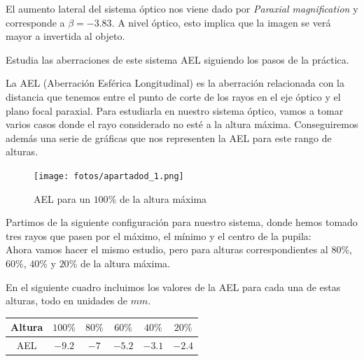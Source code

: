 \documentclass[11pt]{article}
\newcommand{\preguntaAlaMadreDeRocio}[1]{\begin{Theorem}{#1}{}\end{Theorem}}
\begin{document}
        \noindent El aumento lateral del sistema óptico nos viene dado por \textit{Paraxial magnification} y corresponde a $\beta = -3.83$. A nivel óptico, esto implica que la imagen se verá mayor a invertida al objeto.

        \preguntaAlaMadreDeRocio{Estudia las aberraciones de este sistema AEL siguiendo los pasos de la práctica.}
        \noindent La AEL (Aberración Esférica Longitudinal) es la aberración relacionada con la distancia que tenemos entre el punto de corte de los rayos en el eje óptico y el plano focal paraxial. Para estudiarla en nuestro sistema óptico, vamos a tomar varios casos donde el rayo considerado no esté a la altura máxima. Conseguiremos además una serie de gráficas que nos representen la AEL para este rango de alturas.\\ 

        \begin{figure}  
            \vspace{-1cm}
            \caption{AEL para un $100 \%$ de la altura máxima}
            \vspace{-0.2cm}
            \centering
            \texttt{[image: fotos/apartadod\_1.png]}
        \end{figure} 
        
        \noindent Partimos de la siguiente configuración para nuestro sistema, donde hemos tomado tres rayos que pasen por el máximo, el mínimo y el centro de la pupila:\\

        \noindent Ahora vamos hacer el mismo estudio, pero para alturas correspondientes al $80 \%$, $60 \%$, $40 \%$ y $20 \%$ de la altura máxima.
        
        \begin{figure}[h]
            \centering
        \end{figure}
        \begin{figure}[h]
            \centering
        \end{figure}

        \noindent En el siguiente cuadro incluimos los valores de la AEL para cada una de estas alturas, todo en unidades de $mm$.
        \begin{table}[h]
        \centering
            \begin{tabular}{|c|c|c|c|c|c|}
                \hline
                Altura   & $100 \%$ & $80 \%$ & $60 \%$ & $40 \%$ & $20 \%$ \\ \hline
                AEL      & $-9.2$   & $-7$    & $-5.2$  & $-3.1$  & $-2.4$  \\ \hline
            \end{tabular}
        \end{table}
\end{document}

